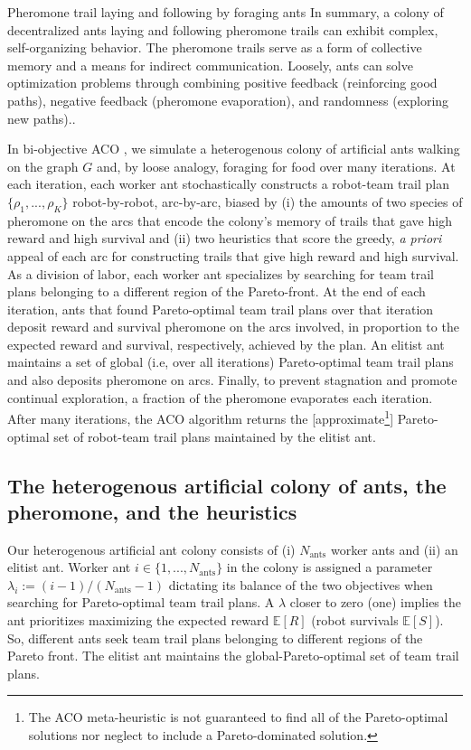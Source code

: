 \documentclass[fleqn,10pt,lineno]{wlpeerj}
\begin{document}
\begin{mybox}[label=box:ants, breakable]{Pheromone trail laying and following by foraging ants}
In summary, a colony of decentralized ants laying and following pheromone trails can exhibit complex, self-organizing behavior.
The pheromone trails serve as a form of collective memory and a means for indirect communication.
Loosely, ants can solve optimization problems through combining positive feedback (reinforcing good paths), negative feedback (pheromone evaporation), and randomness (exploring new paths).\cite{bonabeau1997self,bonabeau1999swarm,goss1989self,jackson2006communication,edelstein1995trail,watmough1995modelling}.
\end{mybox}

In bi-objective ACO \cite{iredi2001bi}, we simulate a heterogenous colony of artificial ants walking on the graph $G$ and, by loose analogy, foraging for food over many iterations. 
At each iteration, each worker ant stochastically constructs a robot-team trail plan $\{\rho_1, ..., \rho_K\}$ robot-by-robot, arc-by-arc, biased by 
(i) the amounts of two species of pheromone on the arcs that encode the colony's memory of trails that gave high reward and high survival
and 
(ii) two heuristics that score the greedy, \emph{a priori} appeal of each arc for constructing trails that give high reward and high survival.  
As a division of labor, each worker ant specializes by searching for team trail plans belonging to a different region of the Pareto-front.
At the end of each iteration, ants that found Pareto-optimal team trail plans over that iteration deposit reward and survival pheromone on the arcs involved, in proportion to the expected reward and survival, respectively, achieved by the plan.
An elitist ant \cite{dorigo1996ant} maintains a set of global (i.e, over all iterations) Pareto-optimal team trail plans and also deposits pheromone on arcs.
Finally, to prevent stagnation and promote continual exploration, a fraction of the pheromone evaporates each iteration. After many iterations, the ACO algorithm returns the [approximate\footnote{The ACO meta-heuristic is not guaranteed to find all of the Pareto-optimal solutions nor neglect to include a Pareto-dominated solution.}] Pareto-optimal set of robot-team trail plans maintained by the elitist ant. 


\subsection{The heterogenous artificial colony of ants, the pheromone, and the heuristics}
Our heterogenous artificial ant colony consists of (i) $N_{\text{ants}}$ worker ants and (ii) an elitist ant.
Worker ant $i\in\{1, ..., N_{\text{ants}}\}$ in the colony is assigned a parameter $\lambda_i := (i-1) / (N_{\text{ants}}-1)$ dictating its balance of the two objectives when searching for Pareto-optimal team trail plans.
A $\lambda$ closer to zero (one) implies the ant prioritizes maximizing the expected reward $\mathbb{E}[R]$ (robot survivals $\mathbb{E}[S]$). 
So, different ants seek team trail plans belonging to different regions of the Pareto front.
The elitist ant maintains the global-Pareto-optimal set of team trail plans.
\end{document}

